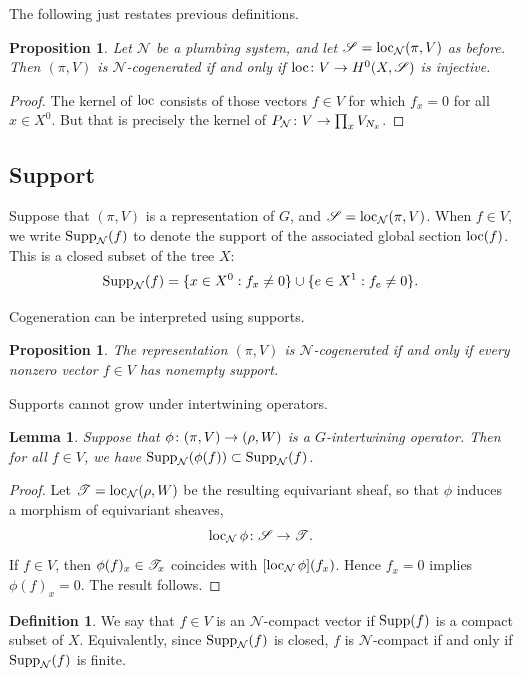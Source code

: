 \documentclass[letter]{amsart}
\newtheorem{lemma}[thm]{Lemma}
\newtheorem{proposition}[thm]{Proposition}
\theoremstyle{definition}
\newtheorem{definition}[thm]{Definition}
\theoremstyle{remark}
\numberwithin{thm}{section}
\numberwithin{equation}{section}
\renewcommand{\NN}{{\mathcal N}}
\begin{document}
The following just restates previous definitions.
\begin{proposition}
Let $\NN$ be a plumbing system, and let $\sheaf{S} = \loc_{\NN}(\pi, V)$ as before.  Then $(\pi, V)$ is $\NN$-cogenerated if and only if $\operatorname{loc} \colon V \rightarrow H^0(X, {\mathscr{S}})$ is injective.
\end{proposition} 
\begin{proof}
The kernel of $\operatorname{loc}$ consists of those vectors $f \in V$ for which $f_x = 0$ for all $x \in X^0$.  But that is precisely the kernel of $P_\NN \From V \To \prod_x V_{N_x}$.  
\end{proof}

\subsection{Support}

Suppose that $(\pi, V)$ is a representation of $G$, and $\sheaf{S} = \loc_{\NN}(\pi, V)$.  When $f \in V$, we write $\Supp_\NN(f)$ to denote the support of the associated global section $\operatorname{loc}(f)$.  This is a closed subset of the tree $X$:
$$\Supp_\NN(f) = \{ x \in X^0 : f_x \neq 0 \} \cup \{ e \in X^1 : f_e \neq 0 \}.$$

Cogeneration can be interpreted using supports.
\begin{proposition}
The representation $(\pi, V)$ is $\NN$-cogenerated if and only if every nonzero vector $f \in V$ has nonempty support.
\end{proposition}

Supports cannot grow under intertwining operators.
\begin{lemma}
\label{cpt-image}
Suppose that $\phi \colon (\pi, V) \rightarrow (\rho, W)$ is a $G$-intertwining operator.  Then for all $f \in V$, we have $\Supp_\NN(\phi(f)) \subset \Supp_\NN(f)$.
\end{lemma}
\begin{proof}
Let $\sheaf{T} = \loc_{\NN}(\rho, W)$ be the resulting equivariant sheaf, so that $\phi$ induces a morphism of equivariant sheaves,
$$\loc_\NN \phi \From \sheaf{S} \To \sheaf{T}.$$
If $f \in V$, then $\phi(f)_x \in {\mathscr{T}}_x$ coincides with $[\loc_\NN \phi]( f_x)$.  Hence $f_x = 0$ implies $\phi(f)_x = 0$.  The result follows.
\end{proof}

\begin{definition}
We say that $f \in V$ is an $\NN$-compact vector if $\operatorname{Supp}(f)$ is a compact subset of $X$.  Equivalently, since $\Supp_\NN(f)$ is closed, $f$ is $\NN$-compact if and only if $\Supp_\NN(f)$ is finite.
\end{definition}
\end{document}
